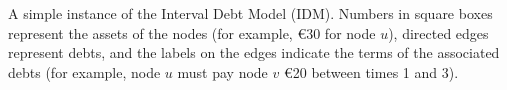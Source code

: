 \documentclass{article}
\begin{document}

A simple instance of the Interval Debt Model (IDM). Numbers in square boxes represent the assets of the nodes (for example, €30 for node \( u \)), directed edges represent debts, and the labels on the edges indicate the terms of the associated debts (for example, node \( u \) must pay node \( v \) €20 between times 1 and 3).
\end{document}
